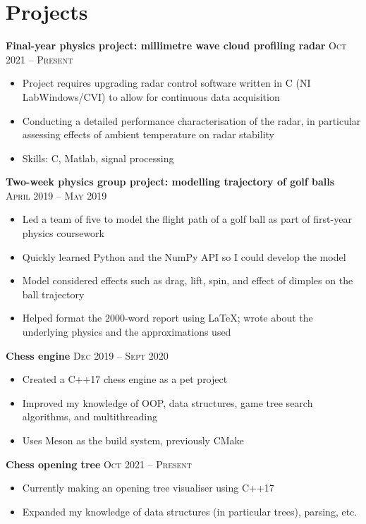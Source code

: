 \documentclass{article}
\begin{document}
	\section*{Projects}
		\textbf{Final-year physics project: millimetre wave cloud profiling radar} \hfill \textsc{Oct 2021 -- Present}
		\begin{itemize}
			\item Project requires upgrading radar control software written in C (NI LabWindows/CVI) to allow for continuous data acquisition
			\item Conducting a detailed performance characterisation of the radar, in particular assessing effects of ambient temperature on radar stability
			\item Skills: C, Matlab, signal processing
		\end{itemize}
		\bigskip
		\textbf{Two-week physics group project: modelling trajectory of golf balls} \hfill \textsc{April 2019 -- May 2019}
		\begin{itemize}
			\item Led a team of five to model the flight path of a golf ball as part of first-year physics coursework
			\item Quickly learned Python and the NumPy API so I could develop the model
			\item Model considered effects such as drag, lift, spin, and effect of dimples on the ball trajectory
			\item Helped format the 2000-word report using \LaTeX ; wrote about the underlying physics and the approximations used
		\end{itemize}
		\bigskip
		\textbf{Chess engine} \hfill \textsc{Dec 2019 -- Sept 2020}
		\begin{itemize}
			\item Created a C++17 chess engine as a pet project
			\item Improved my knowledge of OOP, data structures, game tree search algorithms, and multithreading
			\item Uses Meson as the build system, previously CMake
		\end{itemize}
		\bigskip
		\textbf{Chess opening tree} \hfill \textsc{Oct 2021 -- Present}
		\begin{itemize}
			\item Currently making an opening tree visualiser using C++17
			\item Expanded my knowledge of data structures (in particular trees), parsing, etc.
		\end{itemize}
	
\end{document}
